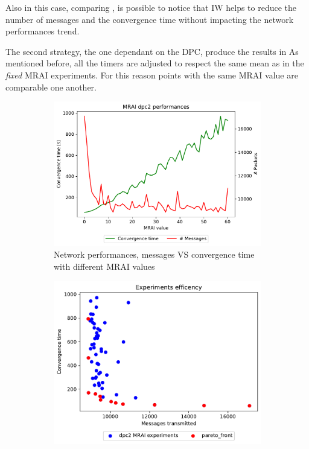 Also in this case, comparing ,
is possible to notice that \ac{IW}
helps to reduce the number of messages and the convergence time without impacting
the network performances trend.

The second strategy, the one dependant on the \ac{DPC}, produce the results
in 
As mentioned before, all the timers are adjusted to respect the same mean as in
the \textit{fixed} \ac{MRAI} experiments.
For this reason points with the same \ac{MRAI} value are comparable one another.

\begin{figure}[h]
     \centering
     \begin{subfigure}[b]{0.49\textwidth}
         \centering
         \includegraphics[width=\textwidth]{images/internet_like/1000/dpc/internet_like-DPC_mrai_evolution.pdf}
		 \caption{Network performances, messages VS convergence time with different
			\ac{MRAI} values}
         \label{fig:internt_like_1000_DPC_evolution_evolution}
     \end{subfigure}
     \hfill
     \begin{subfigure}[b]{0.49\textwidth}
         \centering
         \includegraphics[width=\textwidth]{images/internet_like/1000/dpc/internet_like-DPC.pdf}

\end{subfigure}
\end{figure}
